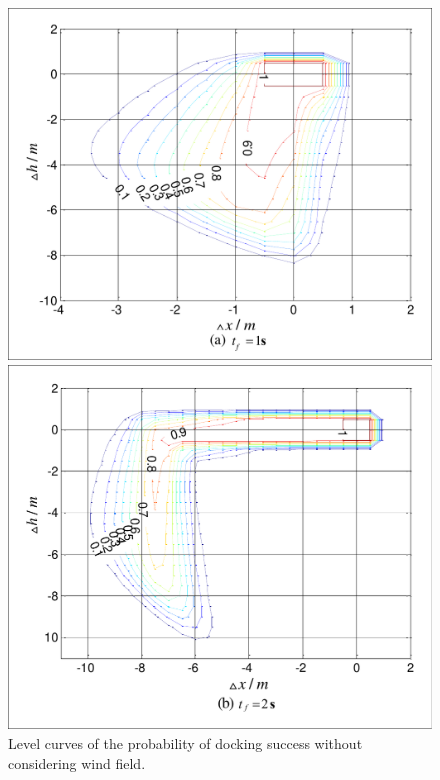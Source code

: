 \begin{figure}[H]
	\begin{minipage}[t]{0.45\textwidth}
		\centering
		\includegraphics[scale=0.45]{Figures/Figs_Ch13/Fig6_1}		
	\end{minipage}
	\qquad
	\begin{minipage}[t]{0.45\textwidth}
		\centering
		\includegraphics[scale=0.45]{Figures/Figs_Ch13/Fig6_2}
	\end{minipage}
	\caption{Level curves of the probability of docking success without considering wind field.\label{Fig6}}
\end{figure}
